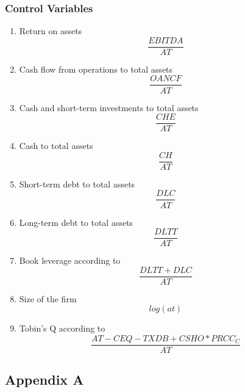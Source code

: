 \documentclass[12pt]{article}
\begin{document}
\subsubsection{Control Variables}
\begin{enumerate}
	\item Return on assets $$\frac{EBITDA}{AT}$$
	\item Cash flow from operations to total assets $$\frac{OANCF}{AT}$$
	\item Cash and short-term investments to total assets $$\frac{CHE}{AT}$$
	\item Cash to total assets $$\frac{CH}{AT}$$
	\item Short-term debt to total assets $$\frac{DLC}{AT}$$
	\item Long-term debt to total assets $$\frac{DLTT}{AT}$$
	\item Book leverage according to \citep[p.1440]{MacKay2005} $$\frac{DLTT+DLC}{AT}$$
	\item Size of the firm $$log(at)$$
	\item Tobin's Q according to \citep[p.120]{Khatami2014} $$\frac{AT-CEQ-TXDB+CSHO*PRCC_C}{AT}$$
\end{enumerate}

\subsection{Appendix A}
\end{document}
